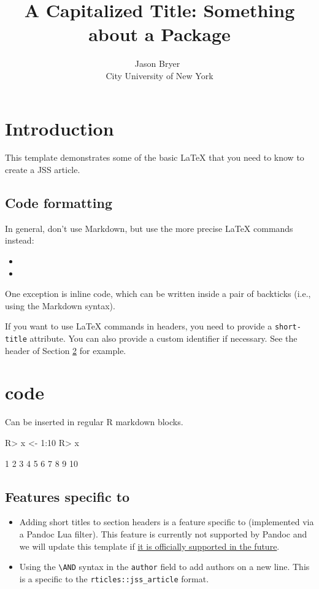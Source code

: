 \documentclass[
]{jss}
\author{
Jason Bryer~\orcidlink{0000-0002-2454-0402}\\City University of New York
}
\title{A Capitalized Title: Something about a Package \pkg{foo}}
\providecommand{\tightlist}{%
  \setlength{\itemsep}{0pt}\setlength{\parskip}{0pt}}
\begin{document}
\section{Introduction}\label{introduction}

This template demonstrates some of the basic LaTeX that you need to know
to create a JSS article.

\subsection{Code formatting}\label{code-formatting}

In general, don't use Markdown, but use the more precise LaTeX commands
instead:

\begin{itemize}
\item
\item
\end{itemize}

One exception is inline code, which can be written inside a pair of
backticks (i.e., using the Markdown syntax).

If you want to use LaTeX commands in headers, you need to provide a
\texttt{short-title} attribute. You can also provide a custom identifier
if necessary. See the header of Section \ref{r-code} for example.

\section[R code]{ code}\label{r-code}

Can be inserted in regular R markdown blocks.

\begin{CodeChunk}
\begin{CodeInput}
R> x <- 1:10
R> x
\end{CodeInput}
\begin{CodeOutput}
 [1]  1  2  3  4  5  6  7  8  9 10
\end{CodeOutput}
\end{CodeChunk}

\subsection[Features specific to rticles]{Features specific to
}\label{features-specific-to}

\begin{itemize}
\tightlist
\item
  Adding short titles to section headers is a feature specific to
   (implemented via a Pandoc Lua filter). This feature is
  currently not supported by Pandoc and we will update this template if
  \href{https://github.com/jgm/pandoc/issues/4409}{it is officially
  supported in the future}.
\item
  Using the \texttt{\textbackslash{}AND} syntax in the \texttt{author}
  field to add authors on a new line. This is a specific to the
  \texttt{rticles::jss\_article} format.
\end{itemize}
\end{document}

